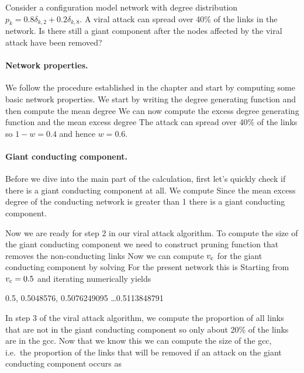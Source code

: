 
Consider a configuration model network with degree distribution $p_k=0.8\delta_{k,2}+0.2 \delta_{k,8}$. A viral attack can spread over 40\% of the links in the network. Is there still a giant component after the nodes affected by the viral attack have been removed? 

\solution 
\paragraph{Network properties.}We follow the procedure established in the chapter and start by computing some basic network properties. We start by writing the degree generating function 
and then compute the mean degree 
We can now compute the excess degree generating function 
and the mean excess degree 
The attack can spread over 40\% of the links so $1-w=0.4$ and hence $w=0.6$.

\paragraph{Giant conducting component.}Before we dive into the main part of the calculation, first let's quickly check if there is a giant conducting component at all. We compute 
Since the mean excess degree of the conducting network is greater than 1 there is a giant conducting component. 

Now we are ready for step 2 in our viral attack algorithm. To compute the size of the giant conducting component we need to construct pruning function that removes the non-conducting links
Now we can compute $v_{\rm c}$ for the giant conducting component by solving 
For the present network this is
Starting from $v_{\rm c}=0.5$ and iterating numerically yields
\begin{center}
    0.5, 0.5048576, 0.5076249095 \ldots 0.5113848791 
\end{center}

In step 3 of the viral attack algorithm, we compute the proportion of all links that are not in the giant conducting component
so only about 20\% of the links are in the gcc. Now that we know this we can compute the size of the gcc, i.e.~the proportion of the links that will be removed if an attack on the giant conducting component occurs as
